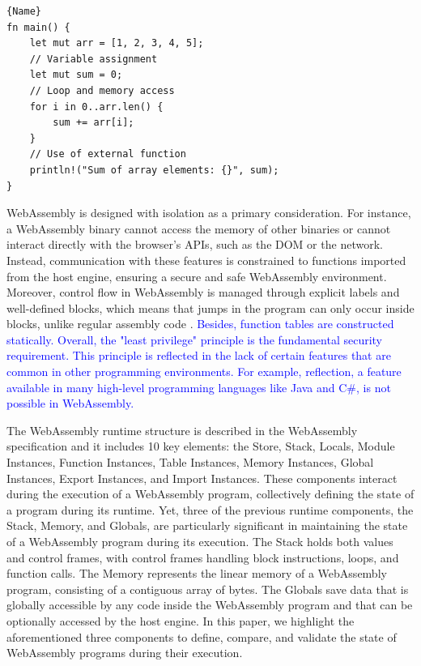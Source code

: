\documentclass[a4paper,fleqn]{cas-dc}
\newcommand*\badge[1]{ \colorbox{red}{\color{white}#1}}
\newcommand{\Wasm}{WebAssembly\xspace}
\newcommand{\revision}[1]{\textcolor{blue}{#1}}
\newcommand{\todo}[1]{%
\refstepcounter{todo}
\noindent\textbf{\badge{TODO}} {\color{red}#1}
\addcontentsline{td}{todo}
{\color{red}\thesection.\thetodo\xspace #1}}
\begin{document}
{
\begin{lstlisting}[label=example:cprogram,caption={A Rust program containing function declaration, loop, conditional and memory access.},captionpos=b]{Name}
fn main() {
    let mut arr = [1, 2, 3, 4, 5];
    // Variable assignment
    let mut sum = 0;
    // Loop and memory access
    for i in 0..arr.len() {
        sum += arr[i];
    }
    // Use of external function
    println!("Sum of array elements: {}", sum);
}
\end{lstlisting}   
}





WebAssembly is designed with isolation as a primary consideration. 
For instance, a WebAssembly binary cannot access the memory of other binaries or cannot interact directly with the browser's APIs, such as the DOM or the network. Instead, communication with these features is constrained to functions imported from the host engine, ensuring a secure and safe WebAssembly environment.
Moreover, control flow in WebAssembly is managed through explicit labels and well-defined blocks, which means that jumps in the program can only occur inside blocks, unlike regular assembly code \cite{10.1145/3062341.3062363}.
\revision{
Besides, function tables are constructed statically.
Overall, the "least privilege" principle is the fundamental security requirement. 
This principle is reflected in the lack of certain features that are common in other programming environments.
For example, reflection, a feature available in many high-level programming languages like Java and C\#, is not possible in \Wasm. 
}





The WebAssembly runtime structure is described in the WebAssembly specification and it includes 10 key elements: the Store, Stack, Locals, Module Instances, Function Instances, Table Instances, Memory Instances, Global Instances, Export Instances, and Import Instances. These components interact during the execution of a WebAssembly program, collectively defining the state of a program during its runtime.
Yet, three of the previous runtime components, the Stack, Memory, and Globals, are particularly significant in maintaining the state of a WebAssembly program during its execution. 
The Stack holds both values and control frames, with control frames handling block instructions, loops, and function calls. 
The Memory represents the linear memory of a WebAssembly program, consisting of a contiguous array of bytes.
The Globals save data that is globally accessible by any code inside the \Wasm program and that can be optionally accessed by the host engine.
In this paper, we highlight the aforementioned three components to define, compare, and validate the state of WebAssembly programs during their execution. 
\end{document}
